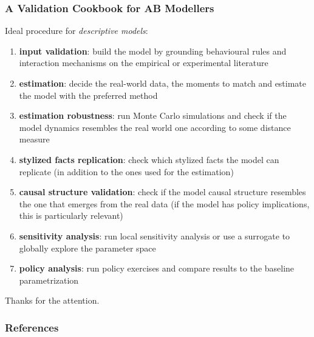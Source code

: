 \documentclass[10pt]{beamer}
\begin{document}
\begin{frame}[c]\frametitle{A Validation Cookbook for AB Modellers} \small
	Ideal procedure for \textit{descriptive models}:
	\begin{enumerate}
		\item \alert{\textbf{input validation}:} build the model by grounding behavioural rules and interaction mechanisms on the empirical or experimental literature 
		\item \alert{\textbf{estimation}:} decide the real-world data, the moments to match and estimate the model with the preferred method
		\item \alert{\textbf{estimation robustness}:} run Monte Carlo simulations and check if the model dynamics resembles the real world one according to some distance measure
		\item \alert{\textbf{stylized facts replication}:} check which stylized facts the model can replicate (in addition to the ones used for the estimation)
		\item \alert{\textbf{causal structure validation}:} check if the model causal structure resembles the one that emerges from the real data (if the model has policy implications, this is particularly relevant)
		\item \alert{\textbf{sensitivity analysis}:} run local sensitivity analysis or use a surrogate to globally explore the parameter space
		\item \alert{\textbf{policy analysis}:} run policy exercises and compare results to the baseline parametrization
	\end{enumerate}
\end{frame}


\begin{frame}[standout]
	Thanks for the attention.
\end{frame}


\begin{frame}[c, allowframebreaks]\frametitle{References}
	\vspace{-1.2cm}
 	\footnotesize
	
	 
\end{frame}
\end{document}
